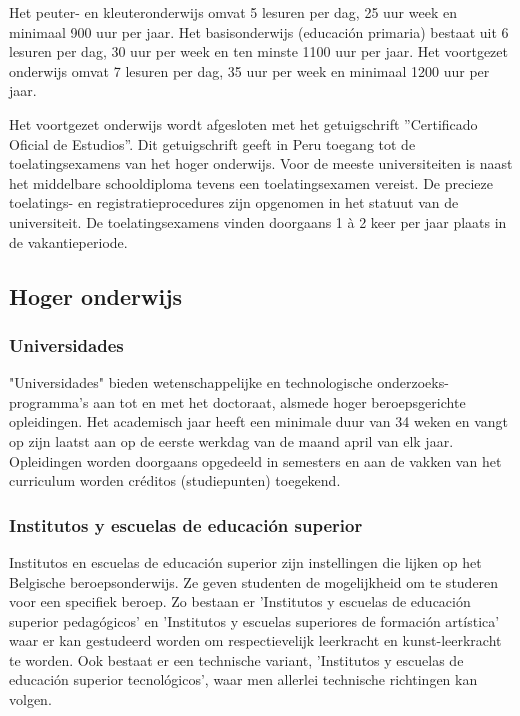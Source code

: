 Het peuter- en kleuteronderwijs omvat 5 lesuren per dag, 25 uur week en minimaal 900 uur per jaar. Het basisonderwijs (educación primaria) bestaat uit 6 lesuren per dag, 30 uur per week en ten minste 1100 uur per jaar. Het voortgezet onderwijs omvat 7 lesuren per dag, 35 uur per week en minimaal 1200 uur per jaar. \autocite{Nuffic2015}

Het voortgezet onderwijs wordt afgesloten met het getuigschrift ''Certificado Oficial de Estudios''. Dit getuigschrift geeft in Peru toegang tot de toelatingsexamens van het hoger onderwijs. Voor de meeste universiteiten is naast het middelbare schooldiploma tevens een toelatingsexamen vereist. De precieze toelatings- en registratieprocedures zijn opgenomen in het statuut van de universiteit. De toelatingsexamens vinden doorgaans 1 à 2 keer per jaar plaats in de vakantieperiode. \autocite{Nuffic2015}

\subsection{Hoger onderwijs}
\subsubsection{Universidades}
 "Universidades" bieden wetenschappelijke en technologische onderzoeks-programma’s aan tot en met het doctoraat, alsmede hoger beroepsgerichte opleidingen. Het academisch jaar heeft een minimale duur van 34 weken en vangt op zijn laatst aan op de eerste werkdag van de maand april van elk jaar. Opleidingen worden doorgaans opgedeeld in semesters en aan de vakken van het curriculum worden créditos (studiepunten) toegekend. \autocite{Nuffic2015}
 
 \subsubsection{Institutos y escuelas de educación superior }
Institutos en escuelas de educación superior zijn instellingen die lijken op het Belgische beroepsonderwijs. Ze geven studenten de mogelijkheid om te studeren voor een specifiek beroep. Zo bestaan er 'Institutos y escuelas de educación superior pedagógicos' en 'Institutos y escuelas superiores de formación artística' waar er kan gestudeerd worden om respectievelijk leerkracht en kunst-leerkracht te worden. Ook bestaat er een technische variant, 'Institutos y escuelas de educación superior tecnológicos', waar men allerlei technische richtingen kan volgen. \autocite{Nuffic2015}

